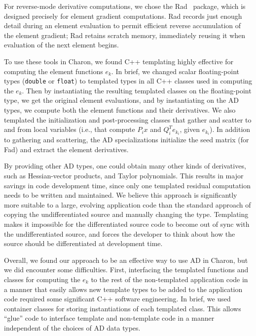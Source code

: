 \documentclass{llncs}
\begin{document}
For reverse-mode derivative computations, we chose the Rad~\cite{Gay2005SDf}
package, which is designed precisely for element gradient computations.
Rad records just enough detail during an element evaluation to
permit efficient reverse accumulation of the element gradient;
Rad retains scratch memory, immediately reusing it when evaluation
of the next element begins.

To use these tools in Charon, we found
C++ templating highly effective for computing the element functions $e_k$.
In brief, we changed scalar floating-point types (\texttt{double}
or \texttt{float}) to templated types in
all C++ classes used in computing the $e_k$.  Then by instantiating
the resulting templated classes on the floating-point type, we get
the original element evaluations, and by instantiating on the AD
types, we compute both the element functions and their derivatives.
We also templated the initialization
and post-processing classes that gather
and scatter to and from local variables (i.e., that compute $P_i x$
and $Q_i^T e_{k_i}$, given $e_{k_i}$).  In addition to
gathering and scattering, the AD specializations
initialize the seed matrix (for Fad) and extract the element derivatives.

By providing other
AD types, one could obtain many other kinds of derivatives,
such as Hessian-vector products, and Taylor polynomials.  This results in major
savings in code development time, since only one templated residual
computation needs to be written and maintained.  We believe this
approach is significantly more suitable to a large, evolving
application code than the standard approach of copying the
undifferentiated source and manually changing the type.  Templating makes it impossible for the differentiated source code
to become out of sync with the undifferentiated source, and forces the
developer to think about how the source should be differentiated at
development time.

Overall, we found our approach to be an effective way to use AD
in Charon, but we did encounter some difficulties.
First, interfacing the templated functions and classes for computing
the $e_k$ to the rest of the non-templated application code in a
manner that easily allows new template types to be added to the
application code required some significant C++ software engineering.
In brief, we used container classes for storing instantiations of
each templated class.  This allows ``glue'' code to interface
template and non-template code in a manner independent of the
choices of AD data types.
\end{document}
